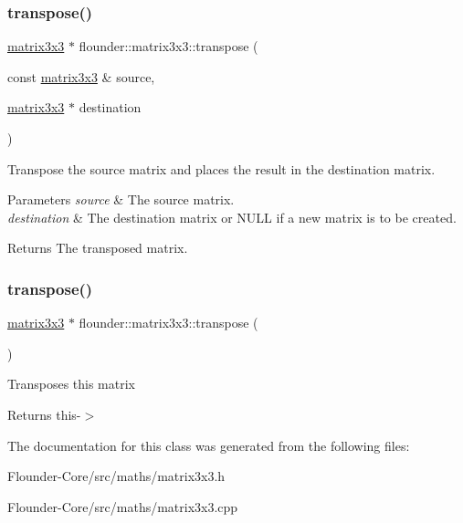 \subsubsection{\texorpdfstring{transpose()}{transpose()}\hspace{0.1cm}{\footnotesize\ttfamily [1/2]}}
{\footnotesize\ttfamily \hyperlink{classflounder_1_1matrix3x3}{matrix3x3} $\ast$ flounder\+::matrix3x3\+::transpose (\begin{DoxyParamCaption}\item[{const \hyperlink{classflounder_1_1matrix3x3}{matrix3x3} \&}]{source,  }\item[{\hyperlink{classflounder_1_1matrix3x3}{matrix3x3} $\ast$}]{destination }\end{DoxyParamCaption})\hspace{0.3cm}{\ttfamily [static]}}



Transpose the source matrix and places the result in the destination matrix. 


\begin{DoxyParams}{Parameters}
{\em source} & The source matrix. \\
\hline
{\em destination} & The destination matrix or N\+U\+LL if a new matrix is to be created. \\
\hline
\end{DoxyParams}
\begin{DoxyReturn}{Returns}
The transposed matrix. 
\end{DoxyReturn}
\mbox{\label{classflounder_1_1matrix3x3_a2cfe1b42645dda116f8251ef183c4028}} 
\subsubsection{\texorpdfstring{transpose()}{transpose()}\hspace{0.1cm}{\footnotesize\ttfamily [2/2]}}
{\footnotesize\ttfamily \hyperlink{classflounder_1_1matrix3x3}{matrix3x3} $\ast$ flounder\+::matrix3x3\+::transpose (\begin{DoxyParamCaption}{ }\end{DoxyParamCaption})}



Transposes this matrix 

\begin{DoxyReturn}{Returns}
this-\/$>$ 
\end{DoxyReturn}


The documentation for this class was generated from the following files\+:\begin{DoxyCompactItemize}
\item 
Flounder-\/\+Core/src/maths/matrix3x3.\+h\item 
Flounder-\/\+Core/src/maths/matrix3x3.\+cpp\end{DoxyCompactItemize}

